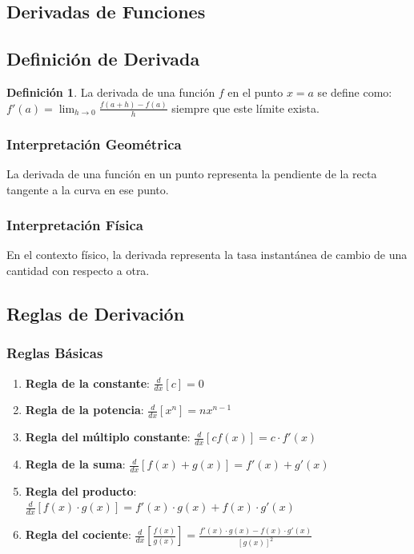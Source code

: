 \documentclass[12pt, a4paper, oneside]{book}
\theoremstyle{definition}
\newtheorem{definicion}{Definición}[chapter]
\begin{document}
\subsection{Derivadas de Funciones}

\subsection{Definición de Derivada}

\begin{definicion}
La derivada de una función $f$ en el punto $x = a$ se define como:
$f'(a) = \lim_{h \to 0} \frac{f(a + h) - f(a)}{h}$
siempre que este límite exista.
\end{definicion}

\subsubsection{Interpretación Geométrica}

La derivada de una función en un punto representa la pendiente de la recta tangente a la curva en ese punto.

\subsubsection{Interpretación Física}

En el contexto físico, la derivada representa la tasa instantánea de cambio de una cantidad con respecto a otra.

\subsection{Reglas de Derivación}

\subsubsection{Reglas Básicas}

\begin{enumerate}
    \item \textbf{Regla de la constante}: $\frac{d}{dx}[c] = 0$
    \item \textbf{Regla de la potencia}: $\frac{d}{dx}[x^n] = nx^{n-1}$
    \item \textbf{Regla del múltiplo constante}: $\frac{d}{dx}[cf(x)] = c \cdot f'(x)$
    \item \textbf{Regla de la suma}: $\frac{d}{dx}[f(x) + g(x)] = f'(x) + g'(x)$
    \item \textbf{Regla del producto}: $\frac{d}{dx}[f(x) \cdot g(x)] = f'(x) \cdot g(x) + f(x) \cdot g'(x)$
    \item \textbf{Regla del cociente}: $\frac{d}{dx}\left[\frac{f(x)}{g(x)}\right] = \frac{f'(x) \cdot g(x) - f(x) \cdot g'(x)}{[g(x)]^2}$
\end{enumerate}
\end{document}
